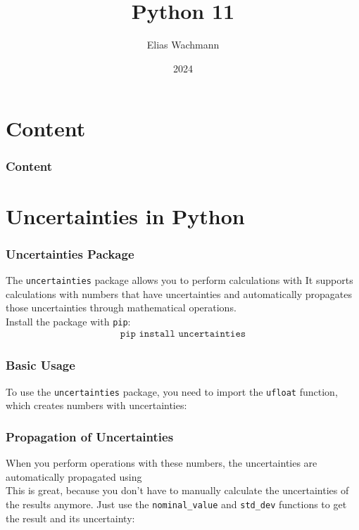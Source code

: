 \documentclass{beamer}
\title[]
{Python 11}
\author[E.~Wachmann]{\scriptsize Elias Wachmann
}
\date{2024} %
\institute[Institute of Theoretical and Computational Physics]
{
}
\begin{document}
\titleframe


\section*{Content}

\begin{frame}
\frametitle{Content}
  \tableofcontents
\end{frame}

\section{Uncertainties in Python}
\begin{frame}
  \frametitle{Uncertainties Package}
  The \texttt{uncertainties} package allows you to perform calculations with 
  It supports calculations with numbers that have uncertainties and automatically propagates those uncertainties through mathematical operations.\\
  \vspace{0.5cm}
  Install the package with \texttt{pip}:
  \begin{align*}
    \texttt{pip install uncertainties}
  \end{align*}
\end{frame}


\begin{frame}
  \frametitle{Basic Usage}
  To use the \texttt{uncertainties} package, you need to import the \texttt{ufloat} function, which creates numbers with uncertainties:
  
\end{frame}

\begin{frame}
  \frametitle{Propagation of Uncertainties}
  When you perform operations with these numbers, the uncertainties are automatically propagated using \\
  \vspace{0.5cm}
  This is great, because you don't have to manually calculate the uncertainties of the results anymore. Just use the \texttt{nominal\_value} and \texttt{std\_dev} functions to get the result and its uncertainty:
\end{frame}
\end{document}
